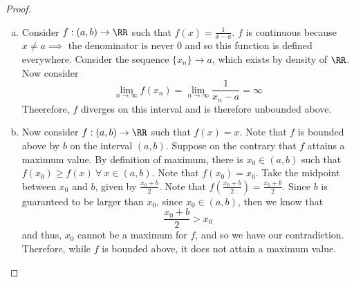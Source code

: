 \documentclass[12pt]{scrartcl}
\begin{document}
\begin{proof}
  
\hfill

\begin{enumerate}[a.]
  \item Consider $f: (a, b) \to \RR$ such that $f(x) = \frac{1}{x-a}$. $f$ is continuous because $x \neq a \implies$ the 
  denominator is never $0$ and so this function is defined everywhere. Consider the sequence 
  $\{x_n\} \to a$, which exists by density of $\RR$. Now consider 
  \[\lim_{n\to\infty}f(x_n) = \lim_{n\to\infty} \frac{1}{x_n - a} = \infty\]
  Theerefore, $f$ diverges on this interval and is therefore unbounded above. 

  \item Now consider $f: (a, b) \to \RR$ such that $f(x) = x$. Note that $f$ is bounded above by $b$ on the
  interval $(a, b)$. Suppose on the contrary that $f$ attains a maximum value. By definition of 
  maximum, there is $x_0 \in (a, b)$ such that $f(x_0) \geq f(x) \ \forall \ x \in (a, b)$. 
  Note that $f(x_0) = x_0$. Take the midpoint between $x_0$ and $b$, given by $\frac{x_0 + b}{2}$. 
  Note that $f(\frac{x_0 + b}{2}) = \frac{x_0 + b}{2}$. Since $b$ is guaranteed to be 
  larger than $x_0$, since $x_0 \in (a,b)$, then we know that 
  \[\frac{x_0 + b}{2} > x_0\]
  and thus, $x_0$ cannot be a maximum for $f$, and so we have our contradiction. Therefore, while 
  $f$ is bounded above, it does not attain a maximum value.
\end{enumerate}


\end{proof}
\end{document}
